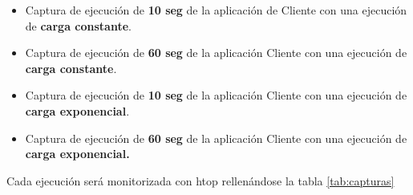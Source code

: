 \documentclass[a4paper,11pt,spanish,twoside]{article}
\begin{document}
\begin{itemize}
\item Captura de ejecución de \textbf{10 seg} de la aplicación de
  Cliente con una ejecución de \textbf{carga constante}.

\item Captura de ejecución de \textbf{60 seg} de la aplicación Cliente
  con una ejecución de \textbf{carga constante}.

\item Captura de ejecución de \textbf{10 seg} de la aplicación Cliente
  con una ejecución de \textbf{carga exponencial}.

\item Captura de ejecución de \textbf{60 seg} de la aplicación Cliente
  con una ejecución de \textbf{carga exponencial.}
\end{itemize}

Cada ejecución será monitorizada con htop rellenándose la tabla \ref{tab:capturas}
\end{document}

